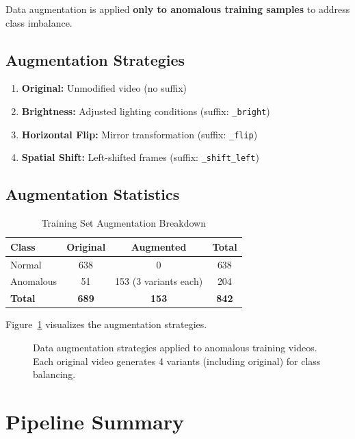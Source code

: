 Data augmentation is applied \textbf{only to anomalous training samples} to address class imbalance.

\subsection{Augmentation Strategies}

\begin{enumerate}
    \item \textbf{Original:} Unmodified video (no suffix)
    \item \textbf{Brightness:} Adjusted lighting conditions (suffix: \texttt{\_bright})
    \item \textbf{Horizontal Flip:} Mirror transformation (suffix: \texttt{\_flip})
    \item \textbf{Spatial Shift:} Left-shifted frames (suffix: \texttt{\_shift\_left})
\end{enumerate}

\subsection{Augmentation Statistics}

\begin{table}[H]
\centering
\caption{Training Set Augmentation Breakdown}
\label{tab:augmentation_stats}
\begin{tabular}{lccc}
\toprule
\textbf{Class} & \textbf{Original} & \textbf{Augmented} & \textbf{Total} \\
\midrule
Normal & 638 & 0 & 638 \\
Anomalous & 51 & 153 (3 variants each) & 204 \\
\midrule
\textbf{Total} & \textbf{689} & \textbf{153} & \textbf{842} \\
\bottomrule
\end{tabular}
\end{table}

Figure~\ref{fig:data_augmentation} visualizes the augmentation strategies.

\begin{figure}[H]
    \centering
    
    \caption{Data augmentation strategies applied to anomalous training videos. Each original video generates 4 variants (including original) for class balancing.}
    \label{fig:data_augmentation}
\end{figure}


\section{Pipeline Summary}

